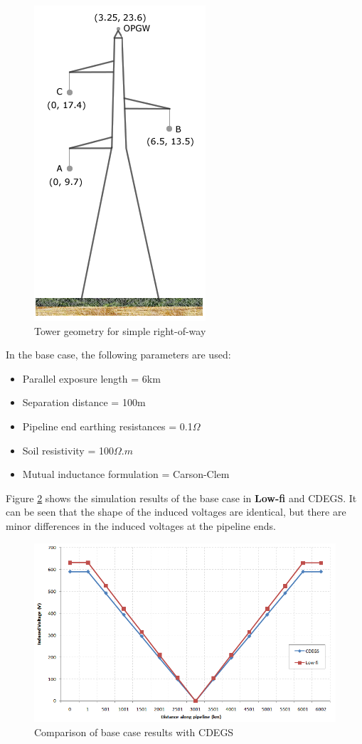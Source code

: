 \documentclass{article}
\begin{document}
\begin{figure}[!htp]
\begin{center}
\caption{Tower geometry for simple right-of-way}
\label{fig:simple_geo}
\includegraphics[width=0.35\linewidth]{./Figures/simple_geo.png}
\end{center}
\end{figure}

In the base case, the following parameters are used:
\begin{itemize}
\item Parallel exposure length = 6km
\item Separation distance = 100m
\item Pipeline end earthing resistances = 0.1$\Omega$
\item Soil resistivity = 100$\Omega.m$
\item Mutual inductance formulation = Carson-Clem
\end{itemize} 

Figure \ref{fig:simple_cdegs} shows the simulation results of the base case in \textbf{Low-fi} and CDEGS. It can be seen that the shape of the induced voltages are identical, but there are minor differences in the induced voltages at the pipeline ends.

\begin{figure}[!htp]
\begin{center}
\caption{Comparison of base case results with CDEGS}
\label{fig:simple_cdegs}
\includegraphics[width=0.8\linewidth]{./Figures/simple_cdegs.png}
\end{center}
\end{figure}
\end{document}
